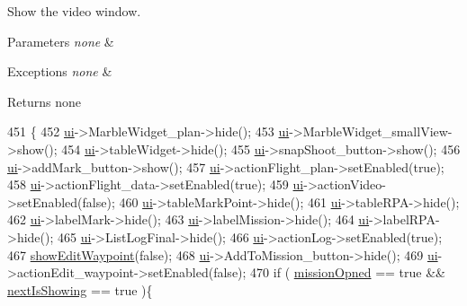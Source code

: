 Show the video window. 


\begin{DoxyParams}{Parameters}
{\em none} & \\
\hline
\end{DoxyParams}

\begin{DoxyExceptions}{Exceptions}
{\em none} & \\
\hline
\end{DoxyExceptions}
\begin{DoxyReturn}{Returns}
none 
\end{DoxyReturn}

\begin{DoxyCode}
451 \{
452     \hyperlink{a00008_a6dc041ef6a2ffb329928d2913e8344e6}{ui}->MarbleWidget\_plan->hide();
453     \hyperlink{a00008_a6dc041ef6a2ffb329928d2913e8344e6}{ui}->MarbleWidget\_smallView->show();
454     \hyperlink{a00008_a6dc041ef6a2ffb329928d2913e8344e6}{ui}->tableWidget->hide();
455     \hyperlink{a00008_a6dc041ef6a2ffb329928d2913e8344e6}{ui}->snapShoot\_button->show();
456     \hyperlink{a00008_a6dc041ef6a2ffb329928d2913e8344e6}{ui}->addMark\_button->show();
457     \hyperlink{a00008_a6dc041ef6a2ffb329928d2913e8344e6}{ui}->actionFlight\_plan->setEnabled(\textcolor{keyword}{true});
458     \hyperlink{a00008_a6dc041ef6a2ffb329928d2913e8344e6}{ui}->actionFlight\_data->setEnabled(\textcolor{keyword}{true});
459     \hyperlink{a00008_a6dc041ef6a2ffb329928d2913e8344e6}{ui}->actionVideo->setEnabled(\textcolor{keyword}{false});
460     \hyperlink{a00008_a6dc041ef6a2ffb329928d2913e8344e6}{ui}->tableMarkPoint->hide();
461     \hyperlink{a00008_a6dc041ef6a2ffb329928d2913e8344e6}{ui}->tableRPA->hide();
462     \hyperlink{a00008_a6dc041ef6a2ffb329928d2913e8344e6}{ui}->labelMark->hide();
463     \hyperlink{a00008_a6dc041ef6a2ffb329928d2913e8344e6}{ui}->labelMission->hide();
464     \hyperlink{a00008_a6dc041ef6a2ffb329928d2913e8344e6}{ui}->labelRPA->hide();
465     \hyperlink{a00008_a6dc041ef6a2ffb329928d2913e8344e6}{ui}->ListLogFinal->hide();
466     \hyperlink{a00008_a6dc041ef6a2ffb329928d2913e8344e6}{ui}->actionLog->setEnabled(\textcolor{keyword}{true});
467     \hyperlink{a00008_a35f9f0904259437c4ae21b41c4f759c1}{showEditWaypoint}(\textcolor{keyword}{false});
468     \hyperlink{a00008_a6dc041ef6a2ffb329928d2913e8344e6}{ui}->AddToMission\_button->hide();
469     \hyperlink{a00008_a6dc041ef6a2ffb329928d2913e8344e6}{ui}->actionEdit\_waypoint->setEnabled(\textcolor{keyword}{false});
470     \textcolor{keywordflow}{if} ( \hyperlink{a00008_aca4d1bee0b4e0f4f21192f73f4053ac7}{missionOpned} == \textcolor{keyword}{true} && \hyperlink{a00008_ab5863d8a21b807194483df01b9c48314}{nextIsShowing} == \textcolor{keyword}{true} )\{

\end{DoxyCode}
